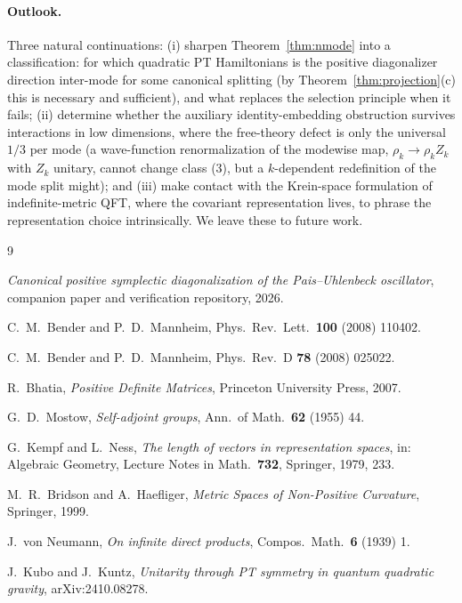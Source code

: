 \documentclass[11pt]{article}
\theoremstyle{definition}
\theoremstyle{remark}
\begin{document}
\paragraph{Outlook.}
Three natural continuations: (i) sharpen Theorem~\ref{thm:nmode} into a
classification: for which quadratic PT Hamiltonians is the positive
diagonalizer direction inter-mode for some canonical splitting
(by Theorem~\ref{thm:projection}(c) this is necessary and sufficient), and
what replaces the selection principle when it fails; (ii) determine
whether the auxiliary identity-embedding obstruction
survives interactions in low dimensions, where the free-theory defect
is only the universal $1/3$ per mode (a wave-function renormalization of the
modewise map, $\rho_k\to\rho_k Z_k$ with $Z_k$ unitary, cannot change class
(3), but a $k$-dependent redefinition of the mode split might); and (iii)
make contact with the Krein-space formulation of indefinite-metric QFT,
where the covariant representation lives, to phrase the representation
choice intrinsically.  We leave these to future work.

\begin{thebibliography}{9}

\emph{Canonical positive symplectic diagonalization of the Pais--Uhlenbeck
oscillator}, companion paper and verification repository, 2026.

C.~M.~Bender and P.~D.~Mannheim,
Phys.\ Rev.\ Lett.\ \textbf{100} (2008) 110402.

C.~M.~Bender and P.~D.~Mannheim,
Phys.\ Rev.\ D \textbf{78} (2008) 025022.

R.~Bhatia, \emph{Positive Definite Matrices}, Princeton University Press,
2007.

G.~D.~Mostow,
\emph{Self-adjoint groups},
Ann.\ of Math.\ \textbf{62} (1955) 44.

G.~Kempf and L.~Ness,
\emph{The length of vectors in representation spaces},
in: Algebraic Geometry, Lecture Notes in Math.\ \textbf{732}, Springer,
1979, 233.

M.~R.~Bridson and A.~Haefliger,
\emph{Metric Spaces of Non-Positive Curvature},
Springer, 1999.

J.~von Neumann,
\emph{On infinite direct products},
Compos.\ Math.\ \textbf{6} (1939) 1.

J.~Kubo and J.~Kuntz,
\emph{Unitarity through PT symmetry in quantum quadratic gravity},
arXiv:2410.08278.

\end{thebibliography}
\end{document}
